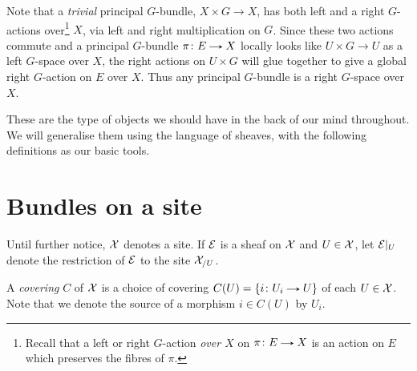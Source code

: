\begin{remark}
  \label{principal-right-action}
  Note that a \emph{trivial} principal $G$-bundle, $X \times G \to X$,
  has both left and a right $G$-actions over\footnote{Recall that a
    left or right $G$-action \emph{over $X$} on $\pi \c E \to X$ is an
    action on $E$ which preserves the fibres of $\pi$.} $X$, via left
  and right multiplication on $G$.  Since these two actions commute
  and a principal $G$-bundle $\pi \c E \to X$ locally looks like $U
  \times G \to U$ as a left $G$-space over $X$, the right actions on
  $U \times G$ will glue together to give a global right $G$-action on
  $E$ over $X$. Thus any principal $G$-bundle is a right $G$-space
  over $X$.
\end{remark}

These are the type of objects we should have in the back of our mind
throughout. We will generalise them using the language of sheaves,
with the following definitions as our basic tools.


\section{Bundles on a site}

\begin{notation}
  Until further notice, $\mathcal{X}$ denotes a site. If $\mathcal{E}$ is a sheaf on
  $\mathcal{X}$ and $U \in \mathcal{X}$, let $\mathcal{E}|_U$ denote the restriction of $\mathcal{E}$ to
  the site $\mathcal{X}_{/U}$.
\end{notation}

\begin{definition}
  A \emph{covering} $C$ of $\mathcal{X}$ is a choice of covering $C(U) = \{i \c
  U_i \to U\}$ of each $U \in \mathcal{X}$. Note that we denote the source of a
  morphism $i \in C(U)$ by $U_i$.
\end{definition}

